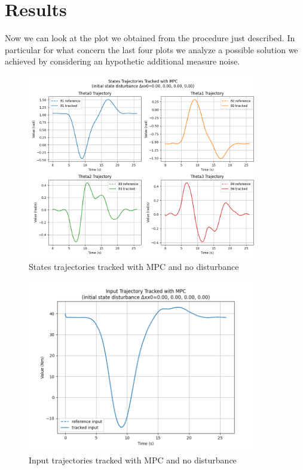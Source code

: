 \documentclass[a4paper,11pt,oneside]{book}
\begin{document}
\section{Results}
\begin{flushleft}
    Now we can look at the plot we obtained from the procedure just described. In particular for what concern the last four plots we analyze a possible solution we achieved by considering an hypothetic additional measure noise.
\end{flushleft}

\clearpage

\begin{figure}[H]
    \centering
    \includegraphics[width=0.9\textwidth]{State_traj_MPC_T4.png}
    \caption{States trajectories tracked with MPC and no disturbance}
    \label{fig:enter-label}
\end{figure}
\begin{figure}[H]
    \centering
    \includegraphics[width=0.9\textwidth]{Input_traj_MPC_T4.png}
    \caption{Input trajectories tracked with MPC and no disturbance}
    \label{fig:enter-label}
\end{figure}
\end{document}
